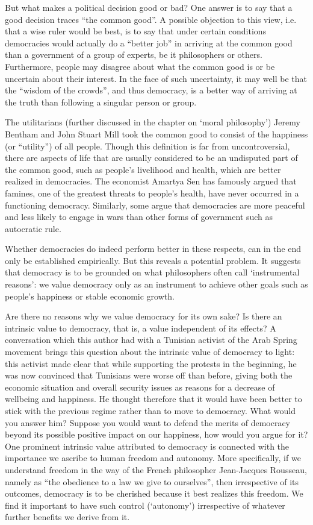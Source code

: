 \documentclass[11pt]{article}
\begin{document}
But what makes a political decision good or bad? One answer is to say that a good decision traces “the common good”. A possible objection to this view, i.e. that a wise ruler would be best, is to say that under certain conditions democracies would actually do a “better job” in arriving at the common good than a government of a group of experts, be it philosophers or others. Furthermore,
people may disagree about what the common good is or be uncertain about their interest. In the face of such uncertainty, it may well be that the “wisdom of the crowds”, and thus democracy, is a better way of arriving at the truth than following a singular person or group.

The utilitarians (further discussed in the chapter on ‘moral philosophy’) Jeremy Bentham and John Stuart Mill took the common good to consist of the happiness
(or “utility”) of all people. Though this definition is far from uncontroversial, there are aspects of life that are usually considered to be an undisputed part of the common good, such as people’s livelihood and health, which are better realized in democracies. The economist Amartya Sen has famously argued that famines,
one of the greatest threats to people’s health, have never occurred in a functioning democracy. Similarly, some argue that democracies are more peaceful and less likely to engage in wars than other forms of government such as autocratic rule.

Whether democracies do indeed perform better in these respects, can in the end only be established empirically. But this reveals a potential problem. It suggests that democracy is to be grounded on what philosophers often call ‘instrumental reasons’: we value democracy only as an instrument to achieve other goals such as people’s happiness or stable economic growth.

Are there no reasons why we value democracy for its own sake? Is there an intrinsic value to democracy, that is, a value independent of its effects? A conversation which this author had with a Tunisian activist of the Arab Spring movement brings this question about the intrinsic value of democracy to light:
this activist made clear that while supporting the protests in the beginning, he was now convinced that Tunisians were worse off than before, giving both the economic situation and overall security issues as reasons for a decrease of wellbeing and happiness. He thought therefore that it would have been better to stick with the previous regime rather than to move to democracy. What would you answer him? Suppose you would want to defend the merits of democracy beyond its possible positive impact on our happiness, how would you argue for it?
One prominent intrinsic value attributed to democracy is connected with the importance we ascribe to human freedom and autonomy. More specifically, if we understand freedom in the way of the French philosopher Jean-Jacques Rousseau, namely as “the obedience to a law we give to ourselves”, then irrespective of its outcomes, democracy is to be cherished because it best realizes this freedom. We find it important to have such control (‘autonomy’)
irrespective of whatever further benefits we derive from it.
\end{document}
